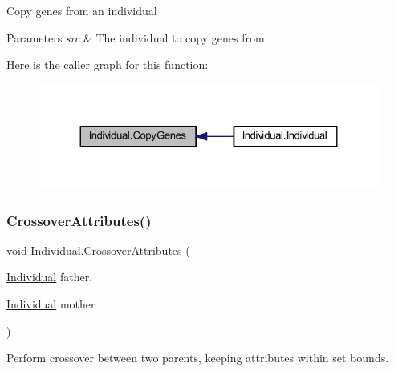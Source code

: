 Copy genes from an individual 


\begin{DoxyParams}{Parameters}
{\em src} & The individual to copy genes from.\\
\hline
\end{DoxyParams}
Here is the caller graph for this function\+:\nopagebreak
\begin{figure}[H]
\begin{center}
\leavevmode
\includegraphics[width=324pt]{class_individual_a7a4c37b420810992cc80448fb7e8652d_icgraph}
\end{center}
\end{figure}
\mbox{\label{class_individual_a874acf4e26980a4e97fe5301a5c019a8}} 
\subsubsection{\texorpdfstring{Crossover\+Attributes()}{CrossoverAttributes()}}
{\footnotesize\ttfamily void Individual.\+Crossover\+Attributes (\begin{DoxyParamCaption}\item[{\mbox{\hyperlink{class_individual}{Individual}}}]{father,  }\item[{\mbox{\hyperlink{class_individual}{Individual}}}]{mother }\end{DoxyParamCaption})}



Perform crossover between two parents, keeping attributes within set bounds. 


